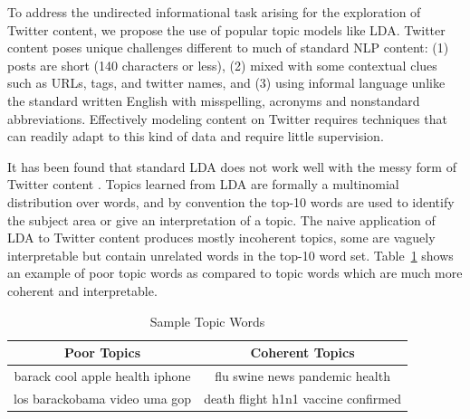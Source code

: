 \documentclass[10pt,a5paper,twoside]{article}
\begin{document}
To address the undirected informational task arising for the 
exploration of Twitter content, we propose the use of popular topic
models like LDA.
Twitter content poses unique challenges different to much of standard
NLP content:  (1)
posts are short (140 characters or less),
(2)
mixed with some contextual clues such as URLs, tags, and twitter names, and
(3)
using informal language unlike the standard written English
with  misspelling, acronyms and nonstandard abbreviations.
Effectively modeling content on Twitter
requires techniques that can readily adapt to this kind of data and
require little supervision.

It has been found that standard LDA \cite{blei03} 
does not work well 
with the messy form of Twitter content \cite{wayne,????}. 
Topics learned from LDA are formally a
multinomial distribution over words, and by convention the top-10
words are used to identify the subject area or give an interpretation
of a topic.   The naive
application of LDA to Twitter content produces mostly incoherent topics,
some are vaguely interpretable but contain unrelated words in the
top-10 word set. Table~\ref{tbl-0} shows an example of poor topic words as compared to topic words which are much more coherent and interpretable. 

\begin{table}[!h]
\centering
{
	\begin{tabular}{|c|c|}
	\hline
        Poor Topics  & Coherent Topics \\
\hline
 {\small barack cool apple health iphone}
 &
 {\small flu swine news pandemic health}\\
 {\small los barackobama video uma gop} & {\small death flight h1n1 vaccine confirmed} \\
 \hline
	\end{tabular}
}
\caption{Sample Topic Words}\label{tbl-0}
\end{table}
\end{document}
